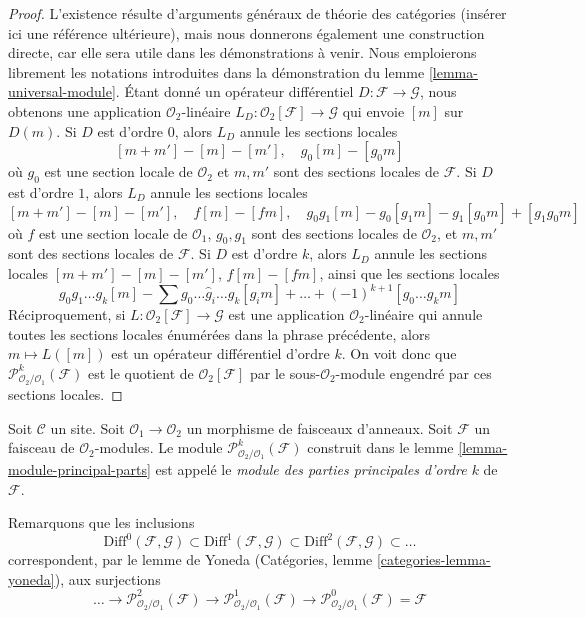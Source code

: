 \begin{proof}
L'existence résulte d'arguments généraux de théorie des catégories
(insérer ici une référence ultérieure), mais nous donnerons également une
construction directe, car elle sera utile dans les démonstrations à venir.
Nous emploierons librement les notations introduites dans la démonstration du
lemme \ref{lemma-universal-module}.
Étant donné un opérateur différentiel $D : \mathcal{F} \to \mathcal{G}$,
nous obtenons une application $\mathcal{O}_2$-linéaire
$L_D : \mathcal{O}_2[\mathcal{F}] \to \mathcal{G}$
qui envoie $[m]$ sur $D(m)$. Si $D$ est d'ordre $0$,
alors $L_D$ annule les sections locales
$$
[m + m'] - [m] - [m'],\quad
g_0[m] - [g_0m]
$$
où $g_0$ est une section locale de $\mathcal{O}_2$ et $m, m'$
sont des sections locales de $\mathcal{F}$. Si $D$ est d'ordre $1$, alors $L_D$
annule les sections locales
$$
[m + m'] - [m] - [m'],\quad
f[m] - [fm], \quad
g_0g_1[m] - g_0[g_1m] - g_1[g_0m] + [g_1g_0m]
$$
où $f$ est une section locale de $\mathcal{O}_1$,
$g_0, g_1$ sont des sections locales de $\mathcal{O}_2$, et
$m, m'$ sont des sections locales de $\mathcal{F}$.
Si $D$ est d'ordre $k$, alors $L_D$ annule les sections locales
$[m + m'] - [m] - [m']$, $f[m] - [fm]$, ainsi que les sections locales
$$
g_0g_1\ldots g_k[m] - \sum g_0 \ldots \hat g_i \ldots g_k[g_im] + \ldots
+(-1)^{k + 1}[g_0\ldots g_km]
$$
Réciproquement, si $L : \mathcal{O}_2[\mathcal{F}] \to \mathcal{G}$ est une
application $\mathcal{O}_2$-linéaire qui annule toutes les sections locales
énumérées dans la phrase précédente, alors $m \mapsto L([m])$ est un
opérateur différentiel d'ordre $k$. On voit donc que
$\mathcal{P}^k_{\mathcal{O}_2/\mathcal{O}_1}(\mathcal{F})$
est le quotient de $\mathcal{O}_2[\mathcal{F}]$ par le
sous-$\mathcal{O}_2$-module engendré par ces sections locales.
\end{proof}

\begin{definition}
\label{definition-module-principal-parts}
Soit $\mathcal{C}$ un site.
Soit $\mathcal{O}_1 \to \mathcal{O}_2$ un morphisme de faisceaux d'anneaux.
Soit $\mathcal{F}$ un faisceau de $\mathcal{O}_2$-modules.
Le module $\mathcal{P}^k_{\mathcal{O}_2/\mathcal{O}_1}(\mathcal{F})$
construit dans le lemme \ref{lemma-module-principal-parts}
est appelé le {\it module des parties principales d'ordre $k$} de $\mathcal{F}$.
\end{definition}

\noindent
Remarquons que les inclusions
$$
\text{Diff}^0(\mathcal{F}, \mathcal{G}) \subset
\text{Diff}^1(\mathcal{F}, \mathcal{G}) \subset
\text{Diff}^2(\mathcal{F}, \mathcal{G}) \subset \ldots
$$
correspondent, par le lemme de Yoneda (Catégories, lemme
\ref{categories-lemma-yoneda}), aux surjections
$$
\ldots \to \mathcal{P}^2_{\mathcal{O}_2/\mathcal{O}_1}(\mathcal{F})
\to \mathcal{P}^1_{\mathcal{O}_2/\mathcal{O}_1}(\mathcal{F})
\to \mathcal{P}^0_{\mathcal{O}_2/\mathcal{O}_1}(\mathcal{F}) = \mathcal{F}
$$

